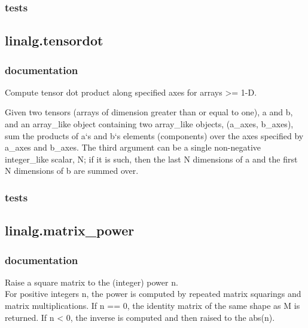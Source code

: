 \subsubsection{tests}
\subsection{linalg.tensordot}
\subsubsection{documentation}
Compute tensor dot product along specified axes for arrays >= 1-D.

Given two tensors (arrays of dimension greater than or equal to one), a and b, and an array\_like object containing two array\_like objects, (a\_axes, b\_axes), sum the products of a‘s and b‘s elements (components) over the axes specified by a\_axes and b\_axes. The third argument can be a single non-negative integer\_like scalar, N; if it is such, then the last N dimensions of a and the first N dimensions of b are summed over.

\subsubsection{tests}


\subsection{linalg.matrix\_power}
\subsubsection{documentation}
Raise a square matrix to the (integer) power n.\\

For positive integers n, the power is computed by repeated matrix squarings and matrix multiplications. If n == 0, the identity matrix of the same shape as M is returned. If n < 0, the inverse is computed and then raised to the abs(n).
